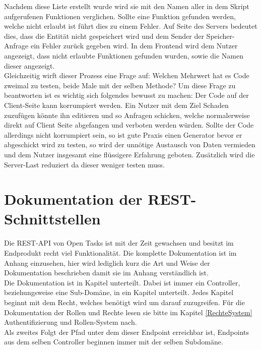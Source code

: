Nachdem diese Liste erstellt wurde wird sie mit den Namen aller in dem Skript aufgerufenen Funktionen verglichen. Sollte eine Funktion gefunden werden, welche nicht erlaubt ist führt dies zu einem Fehler. Auf Seite des Servers bedeutet dies, dass die Entität nicht gespeichert wird und dem Sender der Speicher-Anfrage ein Fehler zurück gegeben wird. In dem Frontend wird dem Nutzer angezeigt, dass nicht erlaubte Funktionen gefunden wurden, sowie die Namen dieser angezeigt. \\

Gleichzeitig wirft dieser Prozess eine Frage auf: Welchen Mehrwert hat es Code zweimal zu testen, beide Male mit der selben Methode? Um diese Frage zu beantworten ist es wichtig sich folgendes bewusst zu machen: Der Code auf der Client-Seite kann korrumpiert werden. Ein Nutzer mit dem Ziel Schaden zuzufügen könnte ihn editieren und so Anfragen schicken, welche normalerweise direkt auf Client Seite abgefangen und verboten werden würden. Sollte der Code allerdings nicht korrumpiert sein, so ist gute Praxis einen Generator bevor er abgeschickt wird zu testen, so wird der unnötige Austausch von Daten vermieden und dem Nutzer insgesamt eine flüssigere Erfahrung geboten. Zusätzlich wird die Server-Last reduziert da dieser weniger testen muss.


\section{Dokumentation der REST-Schnittstellen}

Die REST-API von Open Tasks ist mit der Zeit gewachsen und besitzt im Endprodukt recht viel Funktionalität. Die komplette Dokumentation ist im Anhang einzusehen, hier wird lediglich kurz die Art und Weise der Dokumentation beschrieben damit sie im Anhang verständlich ist. \\

Die Dokumentation ist in Kapitel unterteilt. Dabei ist immer ein Controller, beziehungsweise eine Sub-Domäne, in ein Kapitel unterteilt. Jedes Kapitel beginnt mit dem Recht, welches benötigt wird um darauf zuzugreifen. Für die Dokumentation der Rollen und Rechte lesen sie bitte im Kapitel \ref{RechteSystem} Authentifizierung und Rollen-System nach. \\

Als zweites Folgt der Pfad unter dem dieser Endpoint erreichbar ist, Endpoints aus dem selben Controller beginnen immer mit der selben Subdomäne. \\

